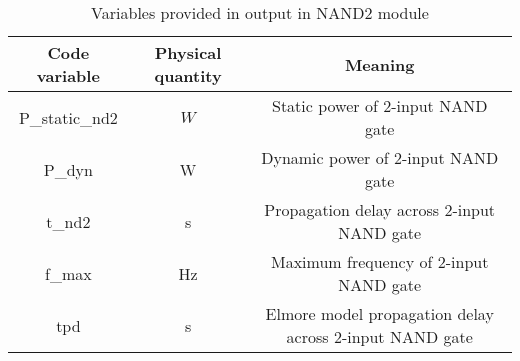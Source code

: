 \begin{table}[htdp]
\begin{center}
\begin{tabular}{|c|c|c|}
\hline
Code variable & Physical quantity & Meaning\\
\hline
P\_static\_nd2 & $W$ & Static power of 2-input NAND gate\\
\hline
P\_dyn & W & Dynamic power of 2-input NAND gate\\
\hline
t\_nd2 & s & Propagation delay across 2-input NAND gate\\
\hline
f\_max & Hz & Maximum frequency of 2-input NAND gate\\
\hline
tpd & s & Elmore model propagation delay across 2-input NAND gate\\
\hline
\end{tabular}
\end{center}
\caption{Variables provided in output in NAND2 module}
\label{tab:output_var}
\end{table}